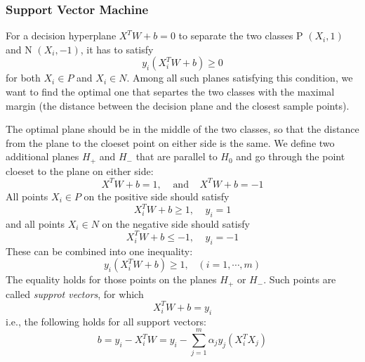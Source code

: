 \subsubsection*{Support Vector Machine}

For a decision hyperplane $X^T W+b=0$ to separate the two classes
P $(X_i,1)$ and N $(X_i,-1)$, it has to satisfy
\[ y_i (X_i^TW+b) \ge 0	\]
for both $X_i \in P$ and $X_i \in N$. Among all such planes satisfying 
this condition, we want to find the optimal one that separtes the two 
classes with the maximal margin (the distance between the decision plane
and the closest sample points).

The optimal plane should be in the middle of the two classes, so that 
the distance from the plane to the cloeset point on either side is the 
same. We define two additional planes $H_+$ and $H_-$ that are parallel
to $H_0$ and go through the point cloeset to the plane on either side:
\[	X^T W+b=1,\;\;\;\;\mbox{and}\;\;\;\;X^T W+b=-1	\]
All points $X_i \in P$ on the positive side should satisfy 
\[ X_i^T W+b \ge 1,\;\;\;\;y_i=1	\]
and all points $X_i \in N$ on the negative side should satisfy
\[ X_i^T W+b \le -1,\;\;\;\; y_i=-1	\]
These can be combined into one inequality:
\[	y_i (X_i^TW +b) \ge 1,\;\;\;(i=1,\cdots,m)	\]
The equality holds for those points on the planes $H_+$ or $H_-$. Such
points are called {\em supprot vectors}, for which 
\[ X_i^T W+b = y_i	\]
i.e., the following holds for all support vectors:
\[ b=y_i-X_i^T W=y_i-\sum_{j=1}^m  \alpha_j y_j (X_i^T X_j)	\]


